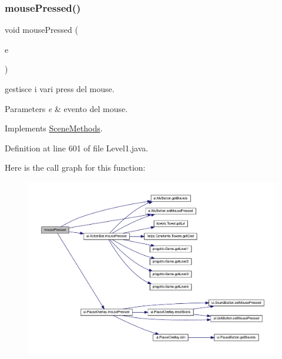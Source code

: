 \subsubsection{\texorpdfstring{mouse\+Pressed()}{mousePressed()}}
{\footnotesize\ttfamily void mouse\+Pressed (\begin{DoxyParamCaption}\item[{Mouse\+Event}]{e }\end{DoxyParamCaption})}



gestisce i vari press del mouse. 


\begin{DoxyParams}{Parameters}
{\em e} & evento del mouse. \\
\hline
\end{DoxyParams}


Implements \hyperlink{interfacescenes_1_1_scene_methods_aed82e1ce3dd3cf283d508c3ba3be70ef}{Scene\+Methods}.



Definition at line 601 of file Level1.\+java.

Here is the call graph for this function\+:\nopagebreak
\begin{figure}[H]
\begin{center}
\leavevmode
\includegraphics[width=350pt]{classscenes_1_1_level1_aed82e1ce3dd3cf283d508c3ba3be70ef_cgraph}
\end{center}
\end{figure}
\mbox{\label{classscenes_1_1_level1_a87a07291794e15052db67f945d90853e}} 
